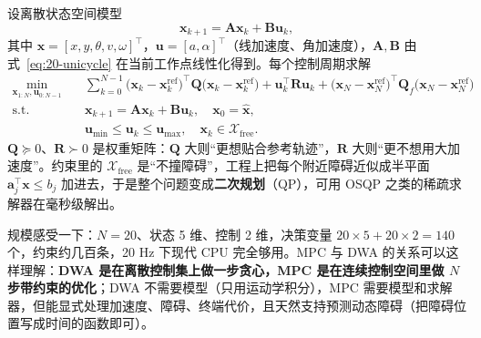 设离散状态空间模型
\begin{equation}
  \bm{x}_{k+1}=\bm{A}\bm{x}_k+\bm{B}\bm{u}_k,
  \label{eq:20-mpc-model}
\end{equation}
其中 $\bm{x}=[x,y,\theta,v,\omega]^{\top}$，$\bm{u}=[a,\alpha]^{\top}$（线加速度、角加速度），$\bm{A},\bm{B}$ 由式~\eqref{eq:20-unicycle} 在当前工作点线性化得到。每个控制周期求解
\begin{equation}
  \begin{aligned}
    \min_{\bm{x}_{1:N},\bm{u}_{0:N-1}}\quad
    &\sum_{k=0}^{N-1}\bigl(\bm{x}_k-\bm{x}_k^{\mathrm{ref}}\bigr)^{\top}\bm{Q}\bigl(\bm{x}_k-\bm{x}_k^{\mathrm{ref}}\bigr)
     +\bm{u}_k^{\top}\bm{R}\bm{u}_k
     +\bigl(\bm{x}_N-\bm{x}_N^{\mathrm{ref}}\bigr)^{\top}\bm{Q}_f\bigl(\bm{x}_N-\bm{x}_N^{\mathrm{ref}}\bigr)\\
    \text{s.t.}\quad
    &\bm{x}_{k+1}=\bm{A}\bm{x}_k+\bm{B}\bm{u}_k,\quad \bm{x}_0=\hat{\bm{x}},\\
    &\bm{u}_{\min}\le\bm{u}_k\le\bm{u}_{\max},\quad \bm{x}_k\in\mathcal{X}_{\mathrm{free}}.
  \end{aligned}
  \label{eq:20-mpc}
\end{equation}
$\bm{Q}\succeq0$、$\bm{R}\succ0$ 是权重矩阵：$\bm{Q}$ 大则“更想贴合参考轨迹”，$\bm{R}$ 大则“更不想用大加速度”。约束里的 $\mathcal{X}_{\mathrm{free}}$ 是“不撞障碍”，工程上把每个附近障碍近似成半平面 $\bm{a}_j^{\top}\bm{x}\le b_j$ 加进去，于是整个问题变成\textbf{二次规划}（QP），可用 OSQP 之类的稀疏求解器在毫秒级解出。

规模感受一下：$N=20$、状态 5 维、控制 2 维，决策变量 $20\times5+20\times2=140$ 个，约束约几百条，20 Hz 下现代 CPU 完全够用。MPC 与 DWA 的关系可以这样理解：\textbf{DWA 是在离散控制集上做一步贪心，MPC 是在连续控制空间里做 $N$ 步带约束的优化}；DWA 不需要模型（只用运动学积分），MPC 需要模型和求解器，但能显式处理加速度、障碍、终端代价，且天然支持预测动态障碍（把障碍位置写成时间的函数即可）。

